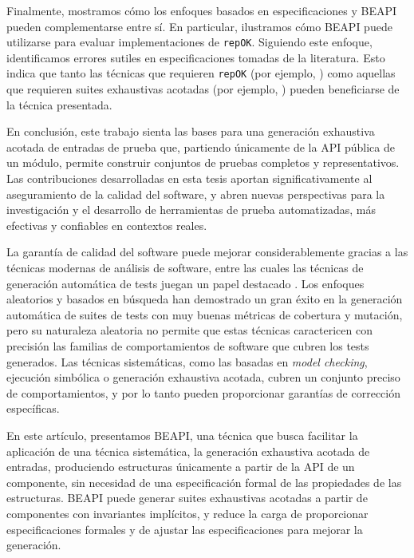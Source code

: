 Finalmente, mostramos cómo los enfoques basados en especificaciones y BEAPI pueden complementarse entre sí. 
En particular, ilustramos cómo BEAPI puede utilizarse para evaluar implementaciones de \texttt{repOK}. 
Siguiendo este enfoque, identificamos errores sutiles en especificaciones tomadas de la literatura. 
Esto indica que tanto las técnicas que requieren \texttt{repOK} (por ejemplo, \cite{Rosner15}) como aquellas que requieren suites exhaustivas acotadas (por ejemplo, \cite{Molina+2021}) 
pueden beneficiarse de la técnica presentada.

En conclusión, este trabajo sienta las bases para una generación exhaustiva acotada de entradas de prueba que, 
partiendo únicamente de la API pública de un módulo, permite construir conjuntos de pruebas completos y representativos. 
Las contribuciones desarrolladas en esta tesis aportan significativamente al aseguramiento de la calidad del software, 
y abren nuevas perspectivas para la investigación y el desarrollo de herramientas de prueba automatizadas, 
más efectivas y confiables en contextos reales.


La garantía de calidad del software puede mejorar considerablemente gracias a las técnicas modernas de análisis de software, 
entre las cuales las técnicas de generación automática de tests juegan un papel destacado \cite{Cadar08, Luckow14, Fraser11, Pacheco07, Ma15, Godefroid05, Marinov01, Boyapati02,Godefroid12}. 
Los enfoques aleatorios y basados en búsqueda han demostrado un gran éxito en la generación automática de suites de tests con muy buenas métricas de cobertura y mutación, 
pero su naturaleza aleatoria no permite que estas técnicas caractericen con precisión las familias de comportamientos de software 
que cubren los tests generados. Las técnicas sistemáticas, como las basadas en \emph{model checking}, ejecución simbólica 
o generación exhaustiva acotada, cubren un conjunto preciso de comportamientos, y por lo tanto pueden proporcionar garantías 
de corrección específicas.

En este artículo, presentamos BEAPI, una técnica que busca facilitar la aplicación de una técnica sistemática, 
la generación exhaustiva acotada de entradas, produciendo estructuras únicamente a partir de la API de un componente, 
sin necesidad de una especificación formal de las propiedades de las estructuras. BEAPI puede generar suites exhaustivas acotadas 
a partir de componentes con invariantes implícitos, y reduce la carga de proporcionar especificaciones formales y de ajustar 
las especificaciones para mejorar la generación. 

